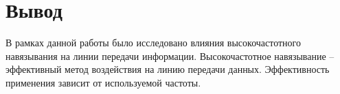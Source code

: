 \chapter{Вывод}

В рамках данной работы было исследовано влияния высокочастотного навязывания на линии передачи информации. Высокочастотное навязывание – эффективный метод воздействия на линию передачи данных. Эффективность применения зависит от используемой частоты.

